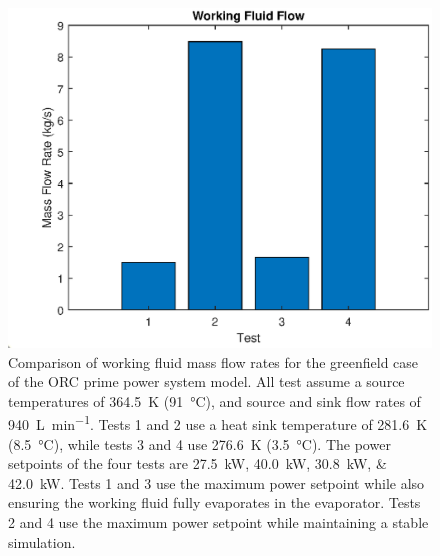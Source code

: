 \begin{figure}[p]
	\centering

	\includegraphics[width=\textwidth]{figures/gfFlow}

	\caption{Comparison of working fluid mass flow rates for the greenfield case of the ORC prime power system model. All test assume a source temperatures of \SI{364.5}{\kelvin} (\SI{91}{\degreeCelsius}), and source and sink flow rates of \SI{940}{\liter\per\minute}. Tests 1 and 2 use a heat sink temperature of \SI{281.6}{\kelvin} (\SI{8.5}{\degreeCelsius}), while tests 3 and 4 use \SI{276.6}{\kelvin} (\SI{3.5}{\degreeCelsius}). The power setpoints of the four tests are \SIlist{27.5;40.0;30.8;42.0}{\kilo\watt}. Tests 1 and 3 use the maximum power setpoint while also ensuring the working fluid fully evaporates in the evaporator. Tests 2 and 4 use the maximum power setpoint while maintaining a stable simulation. }
	\label{fig:gfFlow}
\end{figure}